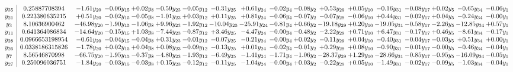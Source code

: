 \documentclass[9pt]{article}
\begin{document}
\[\begin{array}{c| c c@{\hskip 2pt} c@{\hskip 2pt} c@{\hskip 2pt} c@{\hskip 2pt} c@{\hskip 2pt} c@{\hskip 2pt} c@{\hskip 2pt} c@{\hskip 2pt} c@{\hskip 2pt} c@{\hskip 2pt} c@{\hskip 2pt} c@{\hskip 2pt} c@{\hskip 2pt} c@{\hskip 2pt} c@{\hskip 2pt} c@{\hskip 2pt} }
 y_{35}   &  0.25887708394 & -1.61 y_{20} & -0.06 y_{15} & +  0.02 y_{8} & -0.59 y_{23} & -0.05 y_{12} & -0.31 y_{25} & +  0.61 y_{24} & -0.02 y_{4} & -0.08 y_{2} & +  0.53 y_{29} & +  0.05 y_{10} & -0.16 y_{31} & -0.08 y_{17} & +  0.02 y_{5} & -0.65 y_{34} & -0.06 y_{1}\\
 y_{21}   &  0.223380635215 & +  0.51 y_{20} & -0.02 y_{15} & -0.05 y_{8} & -1.01 y_{23} & +  0.03 y_{12} & +  0.11 y_{25} & +  0.81 y_{24} & -0.06 y_{4} & -0.07 y_{2} & -0.07 y_{29} & -0.06 y_{10} & +  0.44 y_{31} & -0.02 y_{17} & +  0.04 y_{5} & -0.24 y_{34} & -0.00 y_{1}\\
 y_{3}   &  8.10636900462 & -46.98 y_{20} & -1.90 y_{15} & -1.06 y_{8} & +  9.96 y_{23} & -1.92 y_{12} & -10.04 y_{25} & -25.91 y_{24} & -0.81 y_{4} & +  0.66 y_{2} & -19.18 y_{29} & +  0.20 y_{10} & -19.05 y_{31} & -0.58 y_{17} & -2.26 y_{5} & -12.85 y_{34} & +  0.57 y_{1}\\
 y_{11}   &  0.641364086834 & -14.64 y_{20} & -0.15 y_{15} & +  1.03 y_{8} & -7.44 y_{23} & -0.87 y_{12} & +  3.46 y_{25} & -4.47 y_{24} & -0.00 y_{4} & -0.48 y_{2} & -2.22 y_{29} & +  0.71 y_{10} & +  6.47 y_{31} & -0.17 y_{17} & +  0.46 y_{5} & -8.61 y_{34} & -0.17 y_{1}\\
 y_{28}   &  0.0966653198954 & -0.61 y_{20} & -0.04 y_{15} & -0.04 y_{8} & +  0.31 y_{23} & -0.01 y_{12} & -0.07 y_{25} & -0.21 y_{24} & -0.00 y_{4} & +  0.02 y_{2} & -0.11 y_{29} & +  0.04 y_{10} & -0.40 y_{31} & -0.04 y_{17} & -0.03 y_{5} & +  0.51 y_{34} & +  0.00 y_{1}\\
 y_{26}   &  0.0338186315826 & -1.78 y_{20} & +  0.02 y_{15} & +  0.04 y_{8} & +  0.08 y_{23} & -0.09 y_{12} & -0.13 y_{25} & +  0.01 y_{24} & -0.02 y_{4} & -0.01 y_{2} & +  0.29 y_{29} & +  0.08 y_{10} & -0.90 y_{31} & -0.01 y_{17} & -0.00 y_{5} & -0.46 y_{34} & -0.04 y_{1}\\
 y_{7}   &  8.56546870998 & -66.75 y_{20} & -1.95 y_{15} & -0.37 y_{8} & -4.80 y_{23} & -1.93 y_{12} & -6.49 y_{25} & -1.41 y_{24} & -1.71 y_{4} & -1.06 y_{2} & -28.37 y_{29} & +  1.29 y_{10} & -28.66 y_{31} & -0.85 y_{17} & -0.95 y_{5} & -16.09 y_{34} & -0.05 y_{1}\\
 y_{27}   &  0.250096036751 & -1.84 y_{20} & -0.03 y_{15} & -0.03 y_{8} & +  0.15 y_{23} & -0.12 y_{12} & -0.11 y_{25} & -1.04 y_{24} & -0.00 y_{4} & +  0.03 y_{2} & -0.22 y_{29} & +  0.05 y_{10} & -1.49 y_{31} & -0.02 y_{17} & -0.09 y_{5} & -1.03 y_{34} & -0.04 y_{1}\\

\end{array}\]
\end{document}
